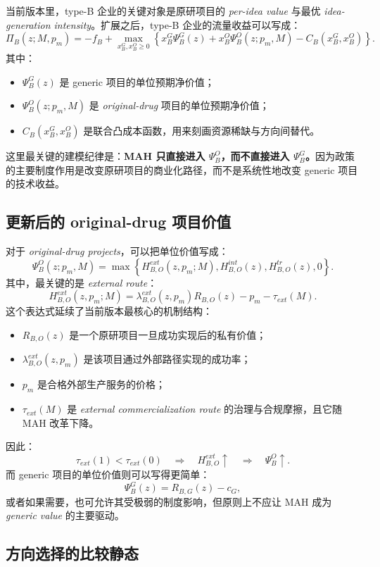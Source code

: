\documentclass[12pt]{ctexart}
\begin{document}
当前版本里，type-B 企业的关键对象是原研项目的 \textit{per-idea value} 与最优 \textit{idea-generation intensity}。扩展之后，type-B 企业的流量收益可以写成：
\[
\Pi_B(z;M,p_m)
=
-f_B
+
\max_{x_B^G,x_B^O\ge 0}
\left\{
 x_B^G\Psi_B^G(z)
+
 x_B^O\Psi_B^O(z;p_m,M)
-
 C_B(x_B^G,x_B^O)
\right\}.
\]
其中：
\begin{itemize}[leftmargin=2em]
    \item $\Psi_B^G(z)$ 是 generic 项目的单位预期净价值；
    \item $\Psi_B^O(z;p_m,M)$ 是 \textit{original-drug} 项目的单位预期净价值；
    \item $C_B(x_B^G,x_B^O)$ 是联合凸成本函数，用来刻画资源稀缺与方向间替代。
\end{itemize}
这里最关键的建模纪律是：\textbf{MAH 只直接进入 $\Psi_B^O$，而不直接进入 $\Psi_B^G$。}因为政策的主要制度作用是改变原研项目的商业化路径，而不是系统性地改变 generic 项目的技术收益。

\subsection{更新后的 original-drug 项目价值}

对于 \textit{original-drug projects}，可以把单位价值写成：
\[
\Psi_B^O(z;p_m,M)
=
\max\left\{
H_{B,O}^{ext}(z,p_m;M),
H_{B,O}^{int}(z),
H_{B,O}^{tr}(z),
0
\right\}.
\]
其中，最关键的是 \textit{external route}：
\[
H_{B,O}^{ext}(z,p_m;M)
=
\lambda_{B,O}^{ext}(z,p_m)R_{B,O}(z)-p_m-\tau_{ext}(M).
\]
这个表达式延续了当前版本最核心的机制结构：
\begin{itemize}[leftmargin=2em]
    \item $R_{B,O}(z)$ 是一个原研项目一旦成功实现后的私有价值；
    \item $\lambda_{B,O}^{ext}(z,p_m)$ 是该项目通过外部路径实现的成功率；
    \item $p_m$ 是合格外部生产服务的价格；
    \item $\tau_{ext}(M)$ 是 \textit{external commercialization route} 的治理与合规摩擦，且它随 MAH 改革下降。
\end{itemize}
因此：
\[
\tau_{ext}(1)<\tau_{ext}(0)
\quad\Rightarrow\quad
H_{B,O}^{ext}\uparrow
\quad\Rightarrow\quad
\Psi_B^O\uparrow.
\]
而 generic 项目的单位价值则可以写得更简单：
\[
\Psi_B^G(z)=R_{B,G}(z)-c_G,
\]
或者如果需要，也可允许其受极弱的制度影响，但原则上不应让 MAH 成为 \textit{generic value} 的主要驱动。

\subsection{方向选择的比较静态}
\end{document}
